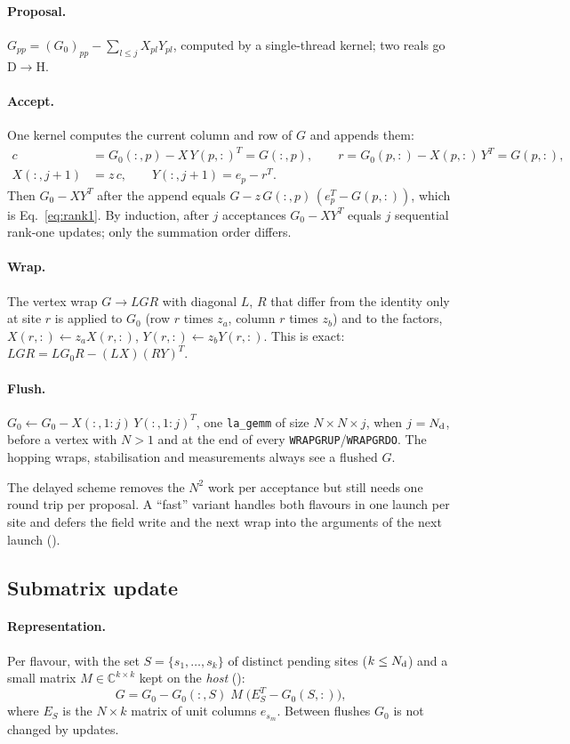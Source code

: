 \paragraph{Proposal.} $G_{pp}=(G_0)_{pp}-\sum_{l\le j}X_{pl}Y_{pl}$, computed by a single-thread kernel; two reals go D$\to$H.
\paragraph{Accept.} One kernel computes the current column and row of $G$ and appends them:
\begin{align}
c &= G_0(:,p) - X\,Y(p,:)^T = G(:,p),\qquad r = G_0(p,:) - X(p,:)\,Y^T = G(p,:),\\
X(:,j{+}1) &= z\,c,\qquad Y(:,j{+}1) = e_p - r^T .
\end{align}
Then $G_0-XY^T$ after the append equals $G - z\,G(:,p)\,(e_p^T-G(p,:))$, which is Eq.~\eqref{eq:rank1}. By induction, after $j$ acceptances $G_0-XY^T$ equals $j$ sequential rank-one updates; only the summation order differs.
\paragraph{Wrap.} The vertex wrap $G\to LGR$ with diagonal $L$, $R$ that differ from the identity only at site $r$ is applied to $G_0$ (row $r$ times $z_a$, column $r$ times $z_b$) and to the factors, $X(r,:)\leftarrow z_aX(r,:)$, $Y(r,:)\leftarrow z_bY(r,:)$. This is exact: $LGR=LG_0R-(LX)(RY)^T$.
\paragraph{Flush.} $G_0\leftarrow G_0-X(:,1{:}j)\,Y(:,1{:}j)^T$, one \texttt{la\_gemm} of size $N\times N\times j$, when $j=N_{\rm d}$, before a vertex with $N>1$ and at the end of every \texttt{WRAPGRUP}/\texttt{WRAPGRDO}. The hopping wraps, stabilisation and measurements always see a flushed $G$.

The delayed scheme removes the $N^2$ work per acceptance but still needs one round trip per proposal. A ``fast'' variant handles both flavours in one launch per site and defers the field write and the next wrap into the arguments of the next launch ().

\subsection{Submatrix update}

\paragraph{Representation.} Per flavour, with the set $S=\{s_1,\ldots,s_k\}$ of distinct pending sites ($k\le N_{\rm d}$) and a small matrix $M\in\mathbb{C}^{k\times k}$ kept on the \emph{host} ():
\begin{equation}
\label{eq:subrep}
G = G_0 - G_0(:,S)\;M\;\bigl(E_S^T-G_0(S,:)\bigr),
\end{equation}
where $E_S$ is the $N\times k$ matrix of unit columns $e_{s_m}$. Between flushes $G_0$ is not changed by updates.

